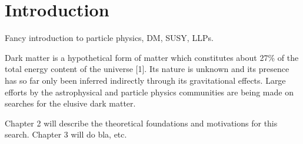 \chapter{Introduction}
\label{chap:introduction}



Fancy introduction to particle physics, DM, SUSY, LLPs.

Dark matter is a hypothetical form of matter which constitutes about 27\% of 
the total energy content of the universe [1]. Its nature is unknown and its 
presence has so far only been inferred indirectly through its gravitational 
effects. Large efforts by the astrophysical and particle physics communities 
are 
being made on searches for the elusive dark matter.

Chapter 2 will describe 
the theoretical foundations and motivations for this search. Chapter 3 will do 
bla, etc.


